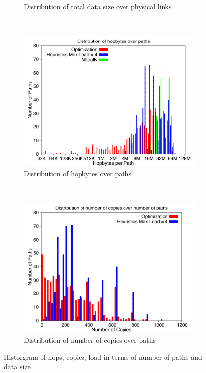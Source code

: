 \begin{figure}[!htbp]
\begin{subfigure}[b]{0.49\textwidth}
                \caption{Distribution of total data size over physical links}
                \label{fig:3_512_loaddata}
        \end{subfigure}
        ~ %
        \begin{subfigure}[b]{0.49\textwidth}
                \includegraphics[width=\textwidth]{report_figures/constantr/3_512/hopbyte_histo.pdf}
                \caption{Distribution of hopbytes over paths}
                \label{fig:3_512_hopbyte}
        \end{subfigure}
        ~ %
        \begin{subfigure}[b]{0.49\textwidth}
                \includegraphics[width=\textwidth]{report_figures/constantr/3_512/hopcopy_histo.pdf}
                \caption{Distribution of number of copies over paths}
                \label{fig:3_512_hopcopy}
        \end{subfigure}
        \caption{Historgram of hops, copies, load in terms of number of paths and data size}
        \label{fig:3_512_histo}
\end{figure}

